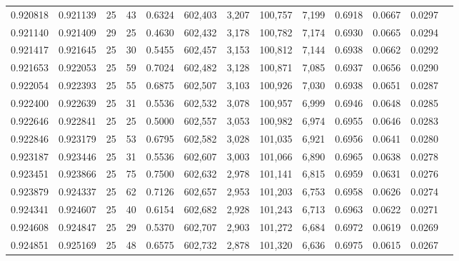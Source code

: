\begin{tabular}{rrrrrrrrrrrrr}
0.920818 & 0.921139 &    25 &  43 &                                     0.6324 & 602,403 &   3,207 & 100,757 &   7,199 & 0.6918 & 0.0667 & 0.0297 \\
0.921140 & 0.921409 &    29 &  25 &                                     0.4630 & 602,432 &   3,178 & 100,782 &   7,174 & 0.6930 & 0.0665 & 0.0294 \\
0.921417 & 0.921645 &    25 &  30 &                                     0.5455 & 602,457 &   3,153 & 100,812 &   7,144 & 0.6938 & 0.0662 & 0.0292 \\
0.921653 & 0.922053 &    25 &  59 &                                     0.7024 & 602,482 &   3,128 & 100,871 &   7,085 & 0.6937 & 0.0656 & 0.0290 \\
0.922054 & 0.922393 &    25 &  55 &                                     0.6875 & 602,507 &   3,103 & 100,926 &   7,030 & 0.6938 & 0.0651 & 0.0287 \\
0.922400 & 0.922639 &    25 &  31 &                                     0.5536 & 602,532 &   3,078 & 100,957 &   6,999 & 0.6946 & 0.0648 & 0.0285 \\
0.922646 & 0.922841 &    25 &  25 &                                     0.5000 & 602,557 &   3,053 & 100,982 &   6,974 & 0.6955 & 0.0646 & 0.0283 \\
0.922846 & 0.923179 &    25 &  53 &                                     0.6795 & 602,582 &   3,028 & 101,035 &   6,921 & 0.6956 & 0.0641 & 0.0280 \\
0.923187 & 0.923446 &    25 &  31 &                                     0.5536 & 602,607 &   3,003 & 101,066 &   6,890 & 0.6965 & 0.0638 & 0.0278 \\
0.923451 & 0.923866 &    25 &  75 &                                     0.7500 & 602,632 &   2,978 & 101,141 &   6,815 & 0.6959 & 0.0631 & 0.0276 \\
0.923879 & 0.924337 &    25 &  62 &                                     0.7126 & 602,657 &   2,953 & 101,203 &   6,753 & 0.6958 & 0.0626 & 0.0274 \\
0.924341 & 0.924607 &    25 &  40 &                                     0.6154 & 602,682 &   2,928 & 101,243 &   6,713 & 0.6963 & 0.0622 & 0.0271 \\
0.924608 & 0.924847 &    25 &  29 &                                     0.5370 & 602,707 &   2,903 & 101,272 &   6,684 & 0.6972 & 0.0619 & 0.0269 \\
0.924851 & 0.925169 &    25 &  48 &                                     0.6575 & 602,732 &   2,878 & 101,320 &   6,636 & 0.6975 & 0.0615 & 0.0267 \\

\end{tabular}
